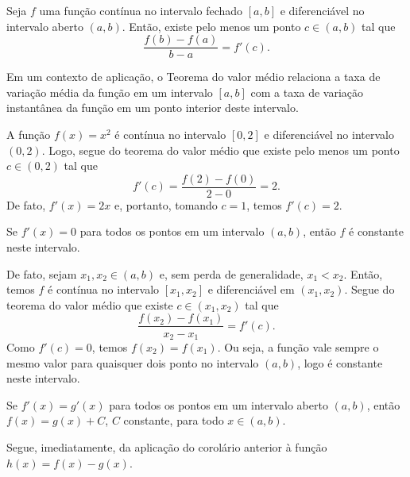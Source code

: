 \begin{teo}
  Seja $f$ uma função contínua no intervalo fechado $[a,b]$ e diferenciável no intervalo aberto $(a,b)$. Então, existe pelo menos um ponto $c\in (a,b)$ tal que
  \begin{equation}
    \frac{f(b)-f(a)}{b-a}=f'(c).
  \end{equation}
\end{teo}

\begin{obs}
  Em um contexto de aplicação, o Teorema do valor médio relaciona a taxa de variação média da função em um intervalo $[a, b]$ com a taxa de variação instantânea da função em um ponto interior deste intervalo.
\end{obs}

\begin{ex}
  A função $f(x)=x^2$ é contínua no intervalo $[0,2]$ e diferenciável no intervalo $(0,2)$. Logo, segue do teorema do valor médio que existe pelo menos um ponto $c\in (0,2)$ tal que
  \begin{equation}
    f'(c)=\frac{f(2)-f(0)}{2-0}=2.
  \end{equation}
  De fato, $f'(x)=2x$ e, portanto, tomando $c=1$, temos $f'(c)=2$.
\end{ex}

\begin{corol}
  Se $f'(x)=0$ para todos os pontos em um intervalo $(a, b)$, então $f$ é constante neste intervalo.
\end{corol}
\begin{dem}
  De fato, sejam $x_1,x_2\in (a, b)$ e, sem perda de generalidade, $x_1<x_2$. Então, temos $f$ é contínua no intervalo $[x_1,x_2]$ e diferenciável em $(x_1,x_2)$. Segue do teorema do valor médio que existe $c\in (x_1,x_2)$ tal que
  \begin{equation}
    \frac{f(x_2)-f(x_1)}{x_2-x_1}=f'(c).
  \end{equation}
  Como $f'(c)=0$, temos $f(x_2)=f(x_1)$. Ou seja, a função vale sempre o mesmo valor para quaisquer dois ponto no intervalo $(a, b)$, logo é constante neste intervalo.
\end{dem}

\begin{corol}\label{corol:apderiv_teomed_2}
  Se $f'(x)=g'(x)$ para todos os pontos em um intervalo aberto $(a,b)$, então $f(x)=g(x)+C$, $C$ constante, para todo $x\in (a,b)$.
\end{corol}
\begin{dem}
  Segue, imediatamente, da aplicação do corolário anterior à função $h(x)=f(x)-g(x)$.
\end{dem}

